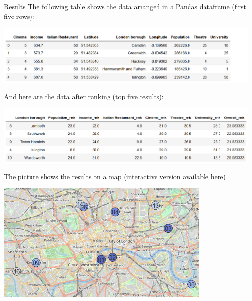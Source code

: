 \documentclass{beamer}
\begin{document}
\begin{frame}[allowframebreaks]{Results}
The following table shows the data arranged in a Pandas dataframe (first five rows):
\vspace{-1.5\baselineskip}
\begin{center}
	\includegraphics[width = \textwidth, keepaspectratio]{images/dataframe-snapshot-1.png}
\end{center}

And here are the data after ranking (top five results):
\vspace{-1.5\baselineskip}
\begin{center}
	\includegraphics[width = \textwidth, keepaspectratio]{images/dataframe-snapshot-2.png}
\end{center}

\vspace{-1.0\baselineskip}

\framebreak
The picture shows the results on a map (interactive version available \href{http://biancovic.droppages.com/}{\underline{here}})

\begin{center}
	\includegraphics[width = 0.8\textwidth, keepaspectratio]{images/map.jpg}
\end{center}

\end{frame}
\end{document}

